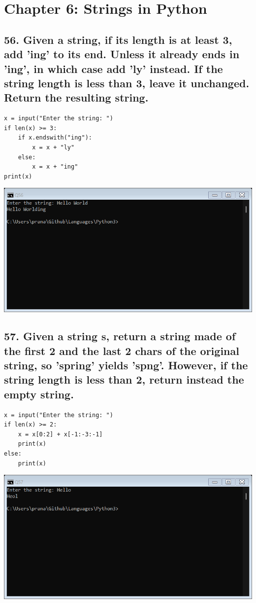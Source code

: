 \documentclass[12pt]{article}
\begin{document}
\section*{Chapter 6: Strings in Python}

\subsection*{56. Given a string, if its length is at least 3, add 'ing' to its end. Unless it already ends in 'ing', in which case add 'ly' instead. If the string length is less than 3, leave it unchanged. Return the resulting string.}
\begin{verbatim}
x = input("Enter the string: ")
if len(x) >= 3:
    if x.endswith("ing"):
        x = x + "ly"
    else:
        x = x + "ing"
print(x)
\end{verbatim}
\includegraphics[width=\linewidth]{images/56.png}

\subsection*{57. Given a string s, return a string made of the first 2 and the last 2 chars of the original string, so 'spring' yields 'spng'. However, if the string length is less than 2, return instead the empty string.}
\begin{verbatim}
x = input("Enter the string: ")
if len(x) >= 2:
    x = x[0:2] + x[-1:-3:-1]
    print(x)
else:
    print(x)
\end{verbatim}
\includegraphics[width=\linewidth]{images/57.png}
\end{document}
